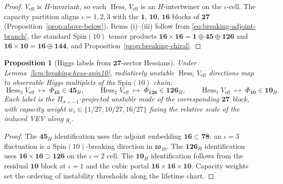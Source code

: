 \documentclass[11pt]{article}
\theoremstyle{plain}
\newtheorem{proposition}[theorem]{Proposition}
\theoremstyle{definition}
\theoremstyle{remark}
\numberwithin{equation}{section}
\newcommand{\Spin}{\mathrm{Spin}}
\newcommand{\Hess}{\operatorname{Hess}}
\begin{document}
\begin{proof}
$V_{\mathrm{eff}}$ is $H$-invariant, so each $\Hess_\iota V_{\mathrm{eff}}$ is
an $H$-intertwiner on the $\iota$-cell. The capacity partition aligns
$\iota=1,2,3$ with the $\mathbf{1}$, $\mathbf{10}$, $\mathbf{16}$ blocks of
$\mathbf{27}$ (Proposition~\ref{prop:above-below}). Items (i)--(iii) follow
from \eqref{eq:breaking-adjoint-branch}, the standard $\Spin(10)$ tensor
products $\mathbf{16}\times\mathbf{16}=\mathbf{1}\oplus\mathbf{45}\oplus
\mathbf{126}$ and $\mathbf{16}\times\mathbf{10}=\mathbf{16}\oplus\mathbf{144}$,
and Proposition~\ref{prop:breaking-chiral}.
\end{proof}

\begin{proposition}[Higgs labels from $\mathbf{27}$-sector Hessians]
\label{prop:breaking-higgs-labels}
Under Lemma~\ref{lem:breaking-hess-spin10}, radiatively unstable
$\Hess_\iota V_{\mathrm{eff}}$ directions map to observable Higgs multiplets
of the $\Spin(10)$ chain:
\begin{equation}\label{eq:breaking-higgs-map}
  \Hess_3 V_{\mathrm{eff}}\;\longmapsto\;\Phi_{\mathbf{45}}\in\mathbf{45}_H,
  \qquad
  \Hess_2 V_{\mathrm{eff}}\;\longmapsto\;\Phi_{\mathbf{126}}\in\mathbf{126}_H,
  \qquad
  \Hess_1 V_{\mathrm{eff}}\;\longmapsto\;\Phi_{\mathbf{10}}\in\mathbf{10}_H.
\end{equation}
Each label is the $\Pi_{\sigma=-1}$-projected unstable mode of the
corresponding $\mathbf{27}$ block, with capacity weight
$w_\iota\in\{1/27,10/27,16/27\}$ fixing the relative scale of the induced
VEV along $g_\iota$.
\end{proposition}

\begin{proof}
The $\mathbf{45}_H$ identification uses the adjoint embedding
$\mathbf{16}\subset\mathbf{78}$: an $\iota=3$ fluctuation is a
$\Spin(10)$-breaking direction in $\mathfrak{so}_{10}$. The $\mathbf{126}_H$
identification uses $\mathbf{16}\times\mathbf{16}\supset\mathbf{126}$ on the
$\iota=2$ cell. The $\mathbf{10}_H$ identification follows from the residual
$\mathbf{10}$ block at $\iota=1$ and the cubic portal
$\mathbf{16}\times\mathbf{16}\times\mathbf{10}$. Capacity weights set the
ordering of instability thresholds along the lifetime chart.
\end{proof}
\end{document}
